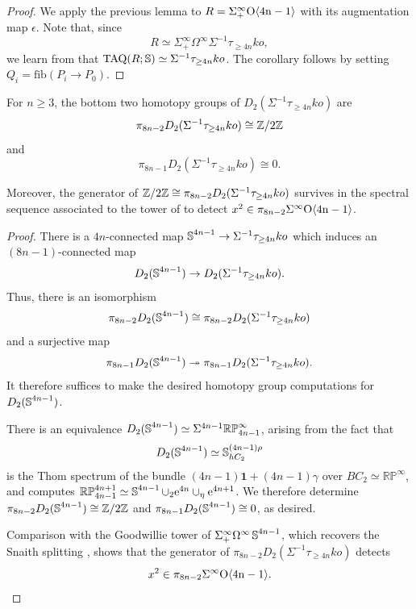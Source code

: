 \begin{proof}
We apply the previous lemma to $R=\Sigma^{\infty}_+ \mathrm{O \langle 4n-1\rangle}$ with its augmentation map $\epsilon$.  Note that, since
$$R \simeq \Sigma^{\infty}_+ \Omega^{\infty} \Sigma^{-1} \tau_{\ge 4n} ko,$$
we learn from \cite[Example 3.9]{KuhnTAQ} that $\mathrm{TAQ}(R;\operatorname{\mathbb{S}}) \simeq \Sigma^{-1} \tau_{\ge 4n} ko$.  The corollary follows by setting
$Q_i = \mathrm{fib}(P_i \to P_0).$
\end{proof}

\begin{lem}\label{lemm:d2-ko-comp}
    For $n \ge 3$, the bottom two homotopy groups of $D_2 (\Sigma^{-1} \tau_{\ge 4n} ko)$ are \[\pi_{8n-2} D_2 (\Sigma^{-1} \tau_{\ge 4n} ko) \cong \mathbb{Z}/2\mathbb{Z}\] and \[\pi_{8n-1} D_2 (\Sigma^{-1} \tau_{\ge 4n} ko) \cong 0.\]

    Moreover, the generator of $\mathbb{Z}/2\mathbb{Z} \cong \pi_{8n-2} D_2 (\Sigma^{-1} \tau_{\ge 4n} ko)$ survives in the spectral sequence associated to the tower of  to detect $x^2 \in \pi_{8n-2} \Sigma^{\infty} \mathrm{O \langle 4n-1\rangle}$.
\end{lem}

\begin{proof}
   There is a $4n$-connected map $\operatorname{\mathbb{S}}^{4n-1} \to \Sigma^{-1} \tau_{\ge 4n} ko$ which induces an $(8n-1)$-connected map
	\[D_2 (\operatorname{\mathbb{S}}^{4n-1}) \to D_2 (\Sigma^{-1} \tau_{\ge 4n} ko).\]
	Thus, there is an isomorphism 
	\[\pi_{8n-2} D_2 (\operatorname{\mathbb{S}}^{4n-1}) \cong \pi_{8n-2} D_2 (\Sigma^{-1} \tau_{\ge 4n} ko)\]
	and a surjective map 
	\[\pi_{8n-1} D_2 (\operatorname{\mathbb{S}}^{4n-1}) \twoheadrightarrow \pi_{8n-1} D_2 (\Sigma^{-1} \tau_{\ge 4n} ko).\]
	It therefore suffices to make the desired homotopy group computations for $D_2 (\operatorname{\mathbb{S}}^{4n-1})$.

    There is an equivalence $D_2 (\operatorname{\mathbb{S}}^{4n-1}) \simeq \Sigma^{4n-1}\mathbb{RP}^\infty _{4n-1}$, arising from the fact that 
		\[D_2(\operatorname{\mathbb{S}}^{4n-1}) \simeq \operatorname{\mathbb{S}}^{(4n-1)\rho}_{hC_2}\]
		is the Thom spectrum of the bundle $(4n-1)\mathbf{1} + (4n-1)\gamma$ over $BC_2 \simeq \mathbb{RP}^{\infty}$, and \cite[Proposition V.3.1]{BMMS} computes $\mathbb{RP}_{4n-1} ^{4n+1} \simeq \operatorname{\mathbb{S}}^{4n-1} \cup_{2} \mathrm{e}^{4n} \cup_{\eta} \mathrm{e}^{4n+1}$. We therefore determine $\pi_{8n-2} D_2 (\operatorname{\mathbb{S}}^{4n-1}) \cong \mathbb{Z}/2\mathbb{Z}$ and $\pi_{8n-1} D_2 (\operatorname{\mathbb{S}}^{4n-1}) \cong 0$, as desired.

    Comparison with the Goodwillie tower of $\Sigma^{\infty} _+ \Omega^{\infty} \operatorname{\mathbb{S}}^{4n-1}$, which recovers the Snaith splitting \cite{KuhnTAQ}, shows that the generator of $\pi_{8n-2} D_2 (\Sigma^{-1} \tau_{\ge 4n} ko)$ detects
    \[ x^2 \in \pi_{8n-2} \Sigma^{\infty} \mathrm{O \langle 4n-1\rangle}. \qedhere\]
\end{proof}

